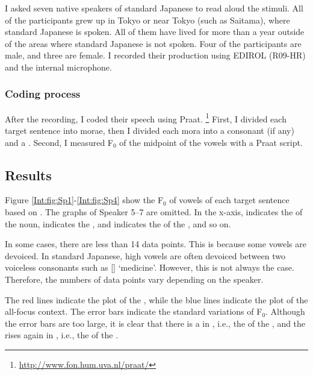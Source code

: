 I asked seven native speakers of standard Japanese
to read aloud the stimuli.
All of the participants grew up in Tokyo or near Tokyo (such as Saitama), where standard Japanese is spoken.
All of them have lived for more than a year outside of the areas where standard Japanese is not spoken.
Four of the participants are male, and three are female.
I recorded their production using EDIROL (R09-HR) and the internal microphone.

\subsubsection{Coding process}\label{Int:IUISUnitExp:Meth:Anot}

After the recording, I coded their speech using Praat.%
\footnote{\url{http://www.fon.hum.uva.nl/praat/}}
First, I divided each target sentence into morae,
then I divided each mora into a consonant (if any) and a .
Second, I measured F$_{0}$ of the midpoint of the vowels with a Praat script.


\subsection{Results}

Figure \ref{Int:fig:Sp1}-\ref{Int:fig:Sp4} show
the F$_{0}$ of vowels of each target sentence based on .
The graphs of Speaker 5--7 are omitted.
In the x-axis,  indicates the  of the noun,  indicates the , and
 indicates the  of the , and so on.

In some cases, there are less than 14 data points.
This is because some vowels are devoiced.
In standard Japanese, high vowels are often devoiced between two voiceless consonants such as  [] `medicine'.
However, this is not always the case.
Therefore, the numbers of data points vary depending on the speaker.

The red lines indicate the plot of the ,
while the blue lines indicate the plot of the all-focus context.
The error bars indicate the standard variations of F$_{0}$.
Although the error bars are too large,
it is clear that there is a  in , i.e., the  of the ,
and the  rises again in , i.e., the  of the .

